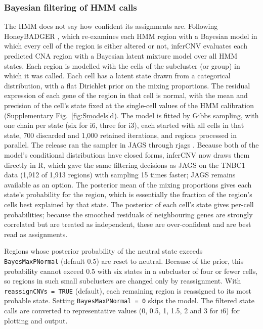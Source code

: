 \subsubsection{Bayesian filtering of HMM calls}

The HMM does not say how confident its assignments are. Following HoneyBADGER \citep{fan2018}, which re-examines each HMM region with a Bayesian model in which every cell of the region is either altered or not, inferCNV evaluates each predicted CNA region with a Bayesian latent mixture model over all HMM states. Each region is modelled with the cells of the subcluster (or group) in which it was called. Each cell has a latent state drawn from a categorical distribution, with a flat Dirichlet prior on the mixing proportions. The residual expression of each gene of the region in that cell is normal, with the mean and precision of the cell's state fixed at the single-cell values of the HMM calibration (Supplementary Fig.~\ref{fig:Smodels}d). The model is fitted by Gibbs sampling, with one chain per state (six for i6, three for i3), each started with all cells in that state, 700 discarded and 1,000 retained iterations, and regions processed in parallel. The release ran the sampler in JAGS through rjags \citep{plummer2003jags, rjags}. Because both of the model's conditional distributions have closed forms, inferCNV now draws them directly in R, which gave the same filtering decisions as JAGS on the TNBC1 data (1,912 of 1,913 regions) with sampling 15 times faster; JAGS remains available as an option. The posterior mean of the mixing proportions gives each state's probability for the region, which is essentially the fraction of the region's cells best explained by that state. The posterior of each cell's state gives per-cell probabilities; because the smoothed residuals of neighbouring genes are strongly correlated but are treated as independent, these are over-confident and are best read as assignments.

Regions whose posterior probability of the neutral state exceeds \texttt{BayesMaxPNormal} (default 0.5) are reset to neutral. Because of the prior, this probability cannot exceed 0.5 with six states in a subcluster of four or fewer cells, so regions in such small subclusters are changed only by reassignment. With \texttt{reassignCNVs\ =\ TRUE} (default), each remaining region is reassigned to its most probable state. Setting \texttt{BayesMaxPNormal\ =\ 0} skips the model. The filtered state calls are converted to representative values (0, 0.5, 1, 1.5, 2 and 3 for i6) for plotting and output.

